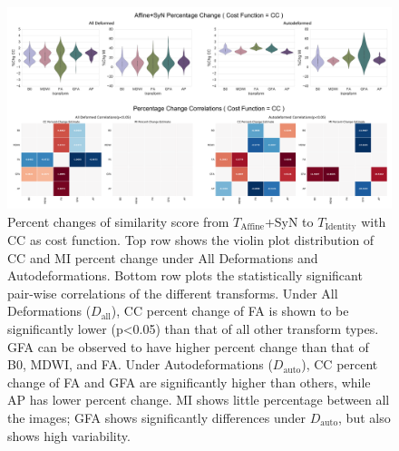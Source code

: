 {\begin{landscape}
        \begin{figure}[p]
        \includegraphics[width=\linewidth]{figure6}
        \caption{
        Percent changes of similarity score from \protect $T_{\text{Affine}}$+SyN to \protect $T_{\text{Identity}}$ with CC as cost function. Top row shows the violin plot distribution of CC and MI percent change under All Deformations and Autodeformations. Bottom row plots the statistically significant pair-wise correlations of the different transforms. 
        Under All Deformations (\protect $D_{\text{all}}$), CC percent change of FA is shown to be significantly lower (p<0.05) than that of all other transform types. GFA can be observed to have higher percent change than that of B0, MDWI, and FA. Under Autodeformations (\protect $D_{\text{auto}}$), CC percent change of FA and GFA are significantly higher than others, while AP has lower percent change. MI shows little percentage between all the images; GFA shows significantly differences under \protect $D_{\text{auto}}$, but also shows high variability.}
        \centering
        \label{fig:APfigure6}
        \end{figure}
    \end{landscape}
    
    \clearpage


}
